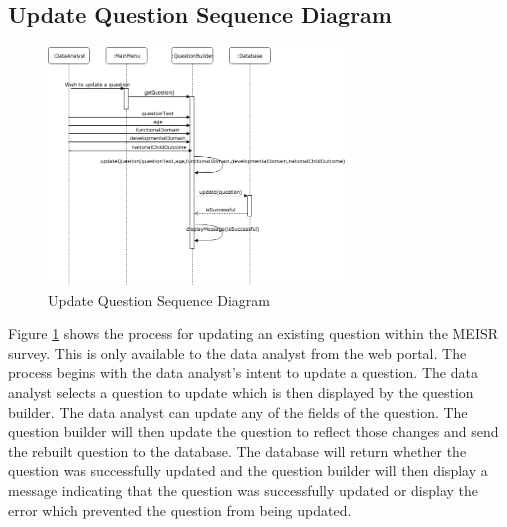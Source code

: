 \subsection{Update Question Sequence Diagram}
\begin{figure}[H]
  \centering
  \includegraphics[width=0.7\textwidth]{images/UpdateQuestionSequenceDiagram.png}
  \caption{Update Question Sequence Diagram}
  \label{fig:updateQuestionSD}
\end{figure}

	Figure \ref{fig:updateQuestionSD} shows the process for updating an existing question within the MEISR survey. This is only available to the data analyst from the web portal. The process begins with the data analyst's intent to update a question. The data analyst selects a question to update which is then displayed by the question builder. The data analyst can update any of the fields of the question. The question builder will then update the question to reflect those changes and send the rebuilt question to the database.  The database will return whether the question was successfully updated and the question builder will then display a message indicating that the question was successfully updated or display the error which prevented the question from being updated.

